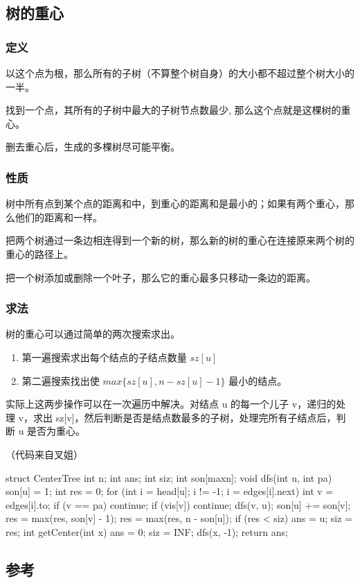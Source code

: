 
\subsection{树的重心}

\subsubsection{定义}

以这个点为根，那么所有的子树（不算整个树自身）的大小都不超过整个树大小的一半。

找到一个点，其所有的子树中最大的子树节点数最少, 那么这个点就是这棵树的重心。

删去重心后，生成的多棵树尽可能平衡。

\subsubsection{性质}

树中所有点到某个点的距离和中，到重心的距离和是最小的；如果有两个重心，那么他们的距离和一样。

把两个树通过一条边相连得到一个新的树，那么新的树的重心在连接原来两个树的重心的路径上。

把一个树添加或删除一个叶子，那么它的重心最多只移动一条边的距离。

\subsubsection{求法}

树的重心可以通过简单的两次搜索求出。

\begin{enumerate}
\item 第一遍搜索求出每个结点的子结点数量 $sz[u]$
\item 第二遍搜索找出使 $max\{sz[u],n-sz[u]-1\}$ 最小的结点。
\end{enumerate}

实际上这两步操作可以在一次遍历中解决。对结点 u 的每一个儿子 v，递归的处理 v，求出 sz[v]，然后判断是否是结点数最多的子树，处理完所有子结点后，判断 u 是否为重心。

（代码来自叉姐）

\begin{cppcode}
struct CenterTree {
  int n;
  int ans;
  int siz;
  int son[maxn];
  void dfs(int u, int pa) {
    son[u] = 1;
    int res = 0;
    for (int i = head[u]; i != -1; i = edges[i].next) {
      int v = edges[i].to;
      if (v == pa) continue;
      if (vis[v]) continue;
      dfs(v, u);
      son[u] += son[v];
      res = max(res, son[v] - 1);
    }
    res = max(res, n - son[u]);
    if (res < siz) {
      ans = u;
      siz = res;
    }
  }
  int getCenter(int x) {
    ans = 0;
    siz = INF;
    dfs(x, -1);
    return ans;
  }
}
\end{cppcode}

\subsection{参考}

\href{http://fanhq666.blog.163.com/blog/static/81943426201172472943638/}{}

\href{https://www.cnblogs.com/zinthos/p/3899075.html}{}
